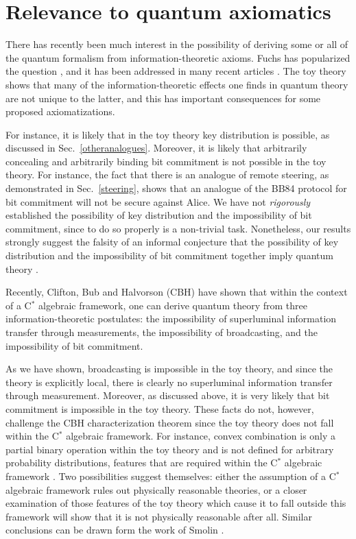 \documentclass[pra,nofootinbib,showpacs,12pt]{revtex4}
\begin{document}
\section{Relevance to quantum axiomatics}

\label{relevancetoaxiomatics}

There has recently been much interest in the possibility of deriving some or
all of the quantum formalism from information-theoretic axioms. Fuchs has
popularized the question \cite{Fuchs}, and it has been addressed in many
recent articles \cite{Fuchs,Halvorson,CBH,Smolin,HalvorsonBub}. The toy
theory shows that many of the information-theoretic effects one finds in
quantum theory are not unique to the latter, and this has important
consequences for some proposed axiomatizations.

For instance, it is likely that in the toy theory key distribution \cite%
{BB84} is possible, as discussed in Sec.~\ref{otheranalogues}. Moreover, it
is likely that arbitrarily concealing and arbitrarily binding bit commitment
\cite{bitcommitment,SpekkensRudolphPRA} is not possible in the toy theory.
For instance, the fact that there is an analogue of remote steering, as
demonstrated in Sec.~\ref{steering}, shows that an analogue of the BB84
protocol for bit commitment \cite{BB84} will not be secure against Alice. We
have not \emph{rigorously} established the possibility of key distribution
and the impossibility of bit commitment, since to do so properly is a
non-trivial task. Nonetheless, our results strongly suggest the falsity of
an informal conjecture that the possibility of key distribution and the
impossibility of bit commitment together imply quantum theory \cite%
{FuchsBrassard}.

Recently, Clifton, Bub and Halvorson (CBH) \cite{CBH} have shown that within
the context of a C$^{*}$ algebraic framework, one can derive quantum theory
from three information-theoretic postulates: the impossibility of
superluminal information transfer through measurements, the impossibility of
broadcasting, and the impossibility of bit commitment.

As we have shown, broadcasting is impossible in the toy theory, and since
the theory is explicitly local, there is clearly no superluminal information
transfer through measurement. Moreover, as discussed above, it is very
likely that bit commitment is impossible in the toy theory. These facts do
not, however, challenge the CBH characterization theorem since the toy
theory does not fall within the C$^{*}$ algebraic framework. For instance,
convex combination is only a partial binary operation within the toy theory
and is not defined for arbitrary probability distributions, features that
are required within the C$^{*}$ algebraic framework \cite{Halvorson}. Two
possibilities suggest themselves: either the assumption of a C$^{*}$
algebraic framework rules out physically reasonable theories, or a closer
examination of those features of the toy theory which cause it to fall
outside this framework will show that it is not physically reasonable after
all. Similar conclusions can be drawn form the work of Smolin \cite{Smolin}.
\end{document}
